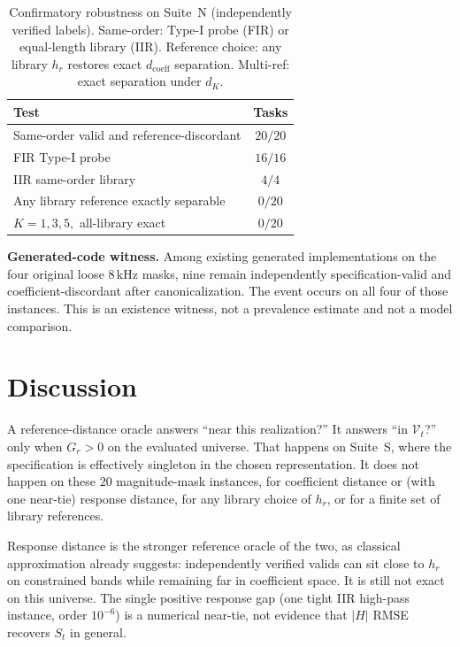 \documentclass{article}
\begin{document}
\begin{table}[t]
\caption{Confirmatory robustness on Suite~N (independently verified
labels).
Same-order: Type-I probe (FIR) or equal-length library (IIR).
Reference choice: any library $h_r$ restores exact $d_{\mathrm{coeff}}$
separation.
Multi-ref: exact separation under $d_K$.}
\label{tab:rob}
\centering
\footnotesize
\setlength{\tabcolsep}{3.0pt}
\begin{tabular}{@{}lc@{}}
\hline
Test & Tasks \\
\hline
Same-order valid and reference-discordant & $20/20$ \\
\quad FIR Type-I probe & $16/16$ \\
\quad IIR same-order library & $4/4$ \\
Any library reference exactly separable & $0/20$ \\
$K=1,3,5,$ all-library exact & $0/20$ \\
\hline
\end{tabular}
\end{table}

\noindent\textbf{Generated-code witness.}
Among existing generated implementations on the four original loose
$8\,\mathrm{kHz}$ masks, nine remain independently
specification-valid and coefficient-discordant after
canonicalization.
The event occurs on all four of those instances.
This is an existence witness, not a prevalence estimate and not a
model comparison.

\section{Discussion}
\label{sec:disc}

A reference-distance oracle answers ``near this realization?''
It answers ``in $\mathcal{V}_t$?'' only when $G_r>0$ on the
evaluated universe.
That happens on Suite~S, where the specification is effectively
singleton in the chosen representation.
It does not happen on these $20$ magnitude-mask instances, for
coefficient distance or (with one near-tie) response distance, for
any library choice of $h_r$, or for a finite set of library
references.

Response distance is the stronger reference oracle of the two, as
classical approximation already suggests: independently verified
valids can sit close to $h_r$ on constrained bands while remaining
far in coefficient space.
It is still not exact on this universe.
The single positive response gap (one tight IIR high-pass instance,
order $10^{-6}$) is a numerical near-tie, not evidence that
$\lvert H\rvert$ RMSE recovers $S_t$ in general.
\end{document}
